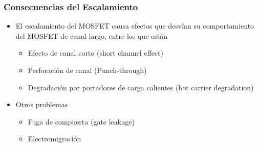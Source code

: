 \documentclass[t,aspectratio=169,10pt]{beamer}
\begin{document}
\begin{frame}
\frametitle{Consecuencias del Escalamiento}
\begin{itemize}
	\item El escalamiento del MOSFET causa efectos que desvían su comportamiento del MOSFET de canal largo, entre los que están
	\begin{itemize}
		\item Efecto de canal corto (short channel effect)
		\item Perforación de canal (Punch-through)
		\item Degradación por portadores de carga calientes (hot carrier degradation)
	\end{itemize}
	\item Otros problemas
	\begin{itemize}
		\item Fuga de compuerta (gate leakage)
		\item Electromigración
	\end{itemize}
\end{itemize}
\end{frame}
\end{document}
